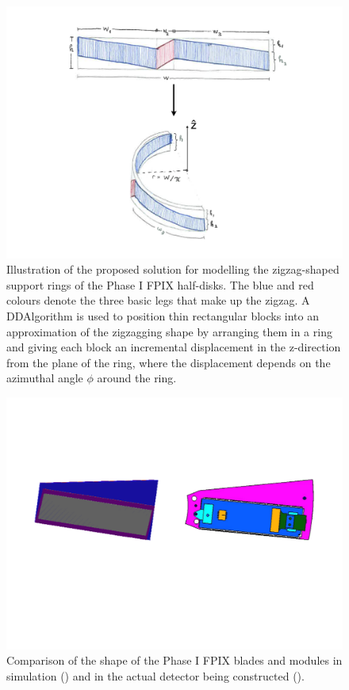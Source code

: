 \begin{figure}[hbtp]
  \begin{center}
    \includegraphics[width=2.0\cmsFigWidth]{figures/phaseI_disksolution}
    \caption{Illustration of the proposed solution for modelling the zigzag-shaped support rings of the Phase I FPIX half-disks. The blue and red colours denote the three basic legs that make up the zigzag. A DDAlgorithm is used to position thin rectangular blocks into an approximation of the zigzagging shape by arranging them in a ring and giving each block an incremental displacement in the z-direction from the plane of the ring, where the displacement depends on the azimuthal angle $\phi$ around the ring.}
    \label{fig:phaseI_disksolution}
  \end{center}
\end{figure}

\begin{figure}[hbtp]
  \begin{center}
    \includegraphics[width=2.0\cmsFigWidth]{figures/phaseI_bladecomparison}
    \caption{Comparison of the shape of the Phase I FPIX blades and modules in simulation (\cmsLeft) and in the actual detector being constructed (\cmsRight).}
    \label{fig:phaseI_bladecomparison}
  \end{center}
\end{figure}
